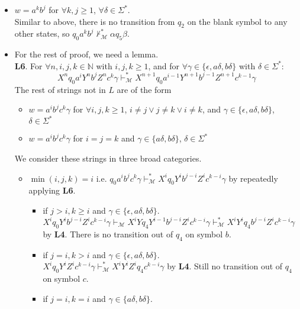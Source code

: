\documentclass[12pt]{article}
\begin{document}
\begin{itemize}
  \item \(w = a^kb^j\) for \(\forall k, j \geq 1\), \(\forall \delta \in \Sigma^*\).\\
  Similar to above, there is no transition from \(q_2\) on the blank symbol to any other states, so \(q_0a^kb^j \nvdash^*_\mathcal{M} \alpha q_5 \beta\).
  \item For the rest of proof, we need a lemma.\\
  \textbf{L6}. For \(\forall n, i, j, k \in \mathbb{N}\) with \(i, j, k \geq 1\), and for \(\forall \gamma \in \{\epsilon, a\delta, b\delta\}\) with \(\delta \in \Sigma^*\):
  \begin{equation*}
    X^nq_0a^iY^nb^jZ^nc^k\gamma \vdash^*_\mathcal{M} X^{n+1}q_0a^{i-1}Y^{n+1}b^{j-1}Z^{n+1}c^{k-1}\gamma
  \end{equation*}
  The rest of strings not in \(L\) are of the form 
  \begin{itemize}
    \item \(w = a^ib^jc^k\gamma\) for \(\forall i,j,k \geq 1\), \(i \neq j \lor  j \neq k \lor i \neq k\), and \(\gamma \in \{\epsilon, a\delta, b\delta\}\), \(\delta \in \Sigma^*\)
    \item \(w = a^ib^jc^k\gamma\) for \(i = j = k\) and \(\gamma \in \{a\delta, b\delta\}\), \(\delta \in \Sigma^*\)
  \end{itemize}
  We consider these strings in three broad categories.
  \begin{itemize}
    \item \(\min(i, j, k) = i\) i.e. \(q_0a^ib^jc^k\gamma \vdash^*_\mathcal{M} X^iq_0Y^ib^{j-i}Z^ic^{k-i}\gamma\) by repeatedly applying \textbf{L6}.
    \begin{itemize}
      \item if \(j > i, k \geq i\) and \(\gamma \in \{\epsilon, a\delta, b\delta\}\).\\ \(X^iq_0Y^ib^{j-i}Z^ic^{k-i}\gamma \vdash_\mathcal{M} X^iYq_4Y^{i-1}b^{j-i}Z^ic^{k-i}\gamma \vdash^*_\mathcal{M} X^iY^iq_4b^{j-i}Z^ic^{k-i}\gamma\) by \textbf{L4}. There is no transition out of \(q_4\) on symbol \(b\).
      \item if \(j = i, k > i\) and \(\gamma \in \{\epsilon, a\delta, b\delta\}\).\\
      \(X^iq_0Y^iZ^ic^{k-i}\gamma \vdash^*_\mathcal{M} X^iY^iZ^iq_4c^{k-i}\gamma\) by \textbf{L4}. Still no transition out of \(q_4\) on symbol \(c\).
      \item if \(j = i, k = i\) and \(\gamma \in \{a\delta, b\delta\}\).\\

\end{itemize}
\end{itemize}
\end{itemize}
\end{document}
